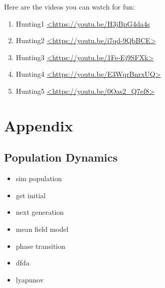 \documentclass[12pt]{article}
\begin{document}
Here are the videos you can watch for fun:

\begin{enumerate} %
\item Hunting1 \url{<https://youtu.be/H3jBpG4da4s}
\item Hunting2 \url{<https://youtu.be/i7qd-9QbBCE>}
\item Hunting3 \url{<https://youtu.be/1Fe-Ej9SFXk>}
\item Hunting4 \url{<https://youtu.be/E3WqrBnrxUQ>}
\item Hunting5 \url{<https://youtu.be/0Oas2_Q7ef8>}
\end{enumerate}




\newpage
\section{Appendix}

\subsection{Population Dynamics}
\singlespacing
\begin{itemize}

\item {\large sim population}

\vspace{1cm}

\item {\large get initial}

\vspace{1cm}

\item {\large next generation}

\vspace{1cm}

\item {\large mean field model}

\vspace{1cm}

\item {\large phase transition}

\vspace{1cm}

\item {\large dfda}

\vspace{1cm}

\item {\large lyapunov}

\vspace{1cm}

\end{itemize}
\end{document}
